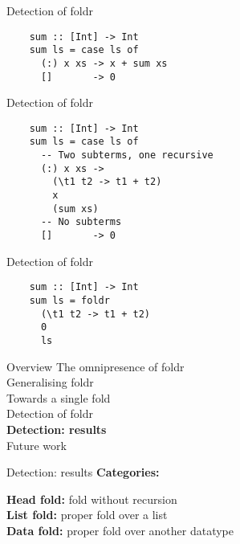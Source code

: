 \documentclass[20pt]{beamer}
\newcommand{\vspaced}{
    \vspace{5mm}
}
\begin{document}
\begin{frame}[fragile]{Detection of foldr}
    \begin{lstlisting}
    sum :: [Int] -> Int
    sum ls = case ls of
      (:) x xs -> x + sum xs
      []       -> 0
    \end{lstlisting}
\end{frame}

\begin{frame}[fragile]{Detection of foldr}
    \begin{lstlisting}
    sum :: [Int] -> Int
    sum ls = case ls of
      -- Two subterms, one recursive
      (:) x xs ->
        (\t1 t2 -> t1 + t2)
        x
        (sum xs)
      -- No subterms
      []       -> 0
    \end{lstlisting}
\end{frame}

\begin{frame}[fragile]{Detection of foldr}
    \begin{lstlisting}
    sum :: [Int] -> Int
    sum ls = foldr
      (\t1 t2 -> t1 + t2)
      0
      ls
    \end{lstlisting}
\end{frame}


\begin{frame}{Overview}
    The omnipresence of foldr \\
    Generalising foldr \\
    Towards a single fold \\
    Detection of foldr \\
    \textbf{Detection: results} \\
    Future work \\
\end{frame}

\begin{frame}{Detection: results}
    \textbf{Categories:} \\
    \vspaced
    \textbf{Head fold:} fold without recursion \\
    \textbf{List fold:} proper fold over a list \\
    \textbf{Data fold:} proper fold over another datatype \\
\end{frame}
\end{document}
